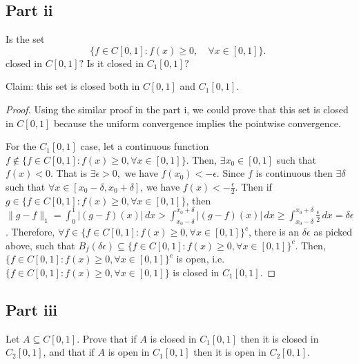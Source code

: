 \subsection{Part ii}

\begin{question}
    Is the set
    $$
    \{f \in C[0,1]: f(x) \geq 0, \quad \forall x \in[0,1]\} \text {. }
    $$
    closed in $C[0,1] ?$ Is it closed in $C_1[0,1] ?$
\end{question}

\begin{answer}
    Claim: this set is closed both in $C[0,1]$ and $C_1[0,1]$.
    \begin{proof}
        Using the similar proof in the part i, we could prove that this set is closed in $C[0,1]$ because the uniform convergence implies the pointwise convergence.
        
        For the $C_1[0,1]$ case, let a continuous function $f \notin \{f \in C[0,1]: f(x) \geq 0, \forall x \in[0,1]\}$. Then, $\exists x_0 \in [0,1]$ such that $f(x) < 0$. That is $\exists \epsilon > 0,$ we have $f(x_0) < -\epsilon$. Since $f$ is continuous then $\exists \delta$ such that $\forall x \in [x_0 - \delta, x_0 + \delta]$, we have $f(x) < -\tfrac{\epsilon}{2}$. Then if $g \in \{f \in C[0,1]: f(x) \geq 0, \forall x \in[0,1]\}$, then $\lVert g - f \rVert_1 = \int_0^1 \lvert (g-f)(x) \rvert\,dx > \int_{x_0-\delta}^{x_0+\delta}\lvert (g-f)(x) \rvert \,dx \geq \int_{x_0-\delta}^{x_0+\delta}\tfrac{\epsilon}{2}\,dx = \delta\epsilon$. Therefore, $\forall f \in \{f \in C[0,1]: f(x) \geq 0, \forall x \in[0,1]\}^c$, there is an $\delta\epsilon$ as picked above, such that $B_{f}(\delta\epsilon) \subseteq \{f \in C[0,1]: f(x) \geq 0, \forall x \in[0,1]\}^c$. Then, $\{f \in C[0,1]: f(x) \geq 0, \forall x \in[0,1]\}^c$ is open, i.e. $\{f \in C[0,1]: f(x) \geq 0, \forall x \in[0,1]\}$ is closed in $C_1[0,1]$.
    \end{proof}
\end{answer}

\subsection{Part iii}

\begin{question}
   Let $A \subseteq C[0,1]$. Prove that if $A$ is closed in $C_1[0,1]$ then it is closed in $C_2[0,1]$, and that if $A$ is open in $C_1[0,1]$ then it is open in $C_2[0,1]$.
\end{question}

\begin{answer}
    
\end{answer}
